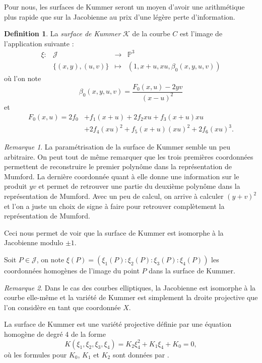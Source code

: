 \documentclass[a4paper,12pt]{article}
\theoremstyle{definition}
\newtheorem{definition}{Definition}[section]
\theoremstyle{remark}
\newtheorem{remarque}{Remarque}
\numberwithin{equation}{section}
\begin{document}
Pour nous, les surfaces de Kummer seront un moyen d'avoir une arithmétique plus rapide que sur la Jacobienne au prix d'une légère perte d'information.

\begin{definition}
La \emph{surface de Kummer} $\mathcal{K}$ de la courbe $C$ est l'image de l'application suivante :
\begin{equation*}
\begin{array}{lrcl}
\xi : &\mathcal{J} & \longrightarrow & \mathbb{P}^3 \\
& \{(x,y),(u,v)\} & \longmapsto & (1,x+u,xu,\beta_0(x,y,u,v))
\end{array}
\end{equation*}
où l'on note
$$\beta_0(x,y,u,v) = \frac{F_0(x,u)-2yv}{(x-u)^2}$$
et
\begin{align*}
F_0(x,u)=2f_0&+f_1(x+u)+2f_2xu+f_3(x+u)xu \\
&+2f_4(xu)^2+f_5(x+u)(xu)^2+2f_6(xu)^3.
\end{align*}
\end{definition}

\begin{remarque}
La paramétrisation de la surface de Kummer semble un peu arbitraire. On peut tout de même remarquer que les trois premières coordonnées permettent de reconstruire le premier polynôme dans la représentation de Mumford. La dernière coordonnée quant à elle donne une information sur le produit $yv$ et permet de retrouver une partie du deuxième polynôme dans la représentation de Mumford. Avec un peu de calcul, on arrive à calculer $(y+v)^2$ et l'on a juste un choix de signe à faire pour retrouver complètement la représentation de Mumford.

Ceci nous permet de voir que la surface de Kummer est isomorphe à la Jacobienne modulo $\pm 1$.
\end{remarque}

Soit $P \in \mathcal{J}$, on note $\xi(P) = (\xi_1(P):\xi_2(P):\xi_3(P):\xi_4(P))$ les coordonnées homogènes de l'image du point $P$ dans la surface de Kummer.

\begin{remarque}
Dans le cas des courbes elliptiques, la Jacobienne est isomorphe à la courbe elle-même et la variété de Kummer est simplement la droite projective que l'on considère en tant que coordonnée $X$.
\end{remarque}

La surface de Kummer est une variété projective définie par une équation homogène de degré 4 de la forme
$$K(\xi_1,\xi_2,\xi_3,\xi_4)=K_2\xi_4^2 + K_1\xi_4 + K_0 = 0,$$
où les formules pour $K_0$, $K_1$ et $K_2$ sont données par \citet{eqKum}.
\end{document}
